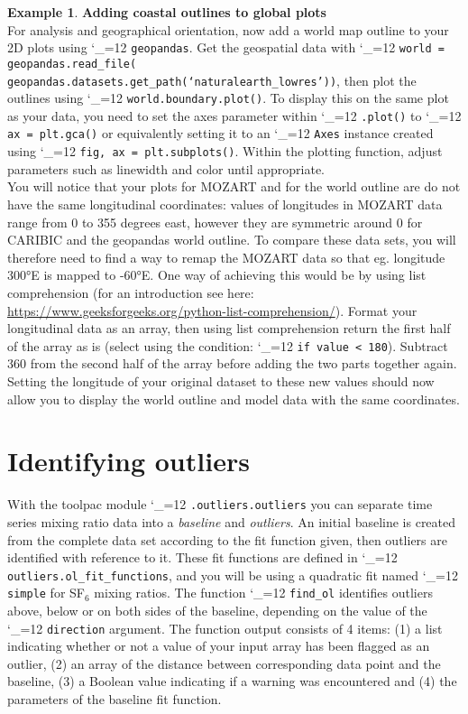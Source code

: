 \documentclass{article}
\makeatletter
\newcommand{\pyf}{%
  \begingroup\catcode`_=12
  \pyf@
}
\newcommand{\pyf@}[1]{\texttt{#1}\endgroup}
\theoremstyle{definition}
\newtheorem{exmp}{Example}[section]
\makeatother
\begin{document}
\begin{exmp}\textbf{Adding coastal outlines to global plots} \\
For analysis and geographical orientation, now add a world map outline to your 2D plots using \pyf{geopandas}. Get the geospatial data with \pyf{world = geopandas.read_file( \linebreak geopandas.datasets.get_path(`naturalearth_lowres'))}, then plot the outlines using \linebreak \pyf{world.boundary.plot()}. To display this on the same plot as your data, you need to set the axes parameter within \pyf{.plot()} to \pyf{ax = plt.gca()} or equivalently setting it to an \pyf{Axes} instance created using \pyf{fig, ax = plt.subplots()}. Within the plotting function, adjust parameters such as linewidth and color until appropriate. \\

You will notice that your plots for MOZART and for the world outline are do not have the same longitudinal coordinates: values of longitudes in MOZART data range from 0 to 355 degrees east, however they are symmetric around 0 for CARIBIC and the geopandas world outline. To compare these data sets, you will therefore need to find a way to remap the MOZART data so that eg. longitude 300°E is mapped to -60°E. One way of achieving this would be by using list comprehension (for an introduction see here: \url{https://www.geeksforgeeks.org/python-list-comprehension/}). Format your longitudinal data as an array, then using list comprehension return the first half of the array as is (select using the condition: \pyf{if value < 180}). Subtract 360 from the second half of the array before adding the two parts together again. Setting the longitude of your original dataset to these new values should now allow you to display the world outline and model data with the same coordinates. \end{exmp}

\section{Identifying outliers}
With the toolpac module \pyf{.outliers.outliers} you can separate time series mixing ratio data into a \textit{baseline} and \textit{outliers}. An initial baseline is created from the complete data set according to the fit function given, then outliers are identified with reference to it. These fit functions are defined in \pyf{outliers.ol_fit_functions}, and you will be using a quadratic fit named \pyf{simple} for SF$_6$ mixing ratios. The function \pyf{find_ol} identifies outliers above, below or on both sides of the baseline, depending on the value of the \pyf{direction} argument. The function output consists of 4 items: (1) a list indicating whether or not a value of your input array has been flagged as an outlier, (2) an array of the distance between corresponding data point and the baseline, (3) a Boolean value indicating if a warning was encountered and (4) the parameters of the baseline fit function. 
\end{document}

